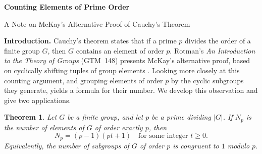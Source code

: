 \documentclass[11pt,letterpaper]{article}
\newtheorem{theorem}{Theorem}
\begin{document}
\begin{center}
{\LARGE\bfseries Counting Elements of Prime Order}\par
\vspace{0.25em}
{\large A Note on McKay's Alternative Proof of Cauchy's Theorem}\par
\end{center}
\vspace{0.48em}

\noindent\textbf{Introduction.}
Cauchy's theorem states that if a prime $p$ divides the order of a finite group $G$, then $G$ contains an element of order $p$. Rotman's \emph{An Introduction to the Theory of Groups} (GTM~148) presents McKay's alternative proof, based on cyclically shifting tuples of group elements \cite{McKay,Rotman}. Looking more closely at this counting argument, and grouping elements of order $p$ by the cyclic subgroups they generate, yields a formula for their number. We develop this observation and give two applications.

\begin{theorem}\label{thm:main}
Let $G$ be a finite group, and let $p$ be a prime dividing $|G|$. If $N_p$ is the number of elements of $G$ of order exactly $p$, then
\begin{equation}\label{eq:main}
\boxed{N_p=(p-1)(pt+1)\quad\text{for some integer }t\ge 0.}
\end{equation}
Equivalently, the number of subgroups of $G$ of order $p$ is congruent to $1$ modulo $p$.
\end{theorem}
\end{document}
